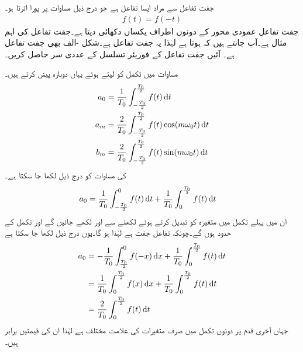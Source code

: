 جفت تفاعل سے مراد ایسا تفاعل ہے جو درج ذیل مساوات پر پورا اترتا ہو۔
\begin{align}
f(t)=f(-t)
\end{align}
جفت  تفاعل عمودی محور کے دونوں اطراف یکساں دکھائی دیتا ہے۔جفت تفاعل کی اہم مثال  ہے۔آپ جانتے ہیں کہ  ہوتا ہے لہٰذا یہ جفت تفاعل ہے۔شکل -الف بھی جفت تفاعل ہے۔ آئیں جفت تفاعل کے فوریئر تسلسل کے عددی سر حاصل کریں۔

مساوات  میں تکمل کو  لیتے ہوئے یہاں دوبارہ پیش کرتے ہیں۔
\begin{gather}
\begin{aligned}\label{مساوات_فوریئر_عددی_سر_جفت}
a_0&=\frac{1}{T_0}\int_{-\frac{T_0}{2}}^{\frac{T_0}{2}}f(t) \dif t\\
a_m&=\frac{2}{T_0}\int_{-\frac{T_0}{2}}^{\frac{T_0}{2}}f(t) \cos (m \omega_0 t) \dif t\\
b_m&=\frac{2}{T_0}\int_{-\frac{T_0}{2}}^{\frac{T_0}{2}}f(t) \sin (m \omega_0 t) \dif t
\end{aligned}
\end{gather}
 کی مساوات کو درج ذیل لکھا جا سکتا ہے۔
\begin{align*}
a_0&=\frac{1}{T_0}\int_{-\frac{T_0}{2}}^0 f(t) \dif t+\frac{1}{T_0}\int_0^{\frac{T_0}{2}} f(t) \dif t
\end{align*}
ان میں پہلے تکمل میں متغیرہ کو تبدیل کرتے ہوئے  لکھنے سے  اور  لکھے جائیں گے اور تکمل کے حدود  ہوں گے۔چونکہ تفاعل جفت ہے لہٰذا  ہو گا۔یوں درج ذیل لکھا جا سکتا ہے
\begin{gather}
\begin{aligned}
a_0&=-\frac{1}{T_0}\int_{\frac{T_0}{2}}^0 f(-x) \dif x+\frac{1}{T_0}\int_0^{\frac{T_0}{2}} f(t) \dif t\\
&=\frac{1}{T_0}\int_0^{\frac{T_0}{2}} f(x) \dif x+\frac{1}{T_0}\int_0^{\frac{T_0}{2}} f(t) \dif t\\
&=\frac{2}{T_0}\int_0^{\frac{T_0}{2}} f(t) \dif t
\end{aligned}
\end{gather}
جہاں آخری قدم پر دونوں تکمل میں صرف متغیرات کی علامت مختلف ہے لہٰذا ان کی قیمتیں برابر ہیں۔

